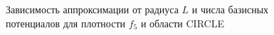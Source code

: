 \documentclass[a4paper, 12pt]{article}
\begin{document}
          \begin{figure}[h!]
            \noindent{}
            \caption{Зависимость аппроксимации от радиуса $L$ и числа базисных потенциалов для плотности $f_5$ и области CIRCLE}
            \label{nolnol}
            \end{figure} 
\end{document}
